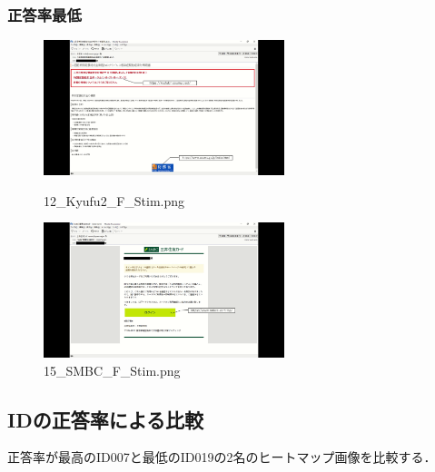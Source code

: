 \documentclass[a4paper,11pt]{ltjsreport}
\begin{document}
\subsubsection{正答率最低}
\begin{figure}[H]
	\centering
	\begin{minipage}{0.49\textwidth}
		\centering
		\includegraphics[width=7cm]{img/stimuli/12_Kyufu2_F_Stim.png}
		\caption{12\_Kyufu2\_F\_Stim.png}
		\label{fig:a121}
	\end{minipage}
	\begin{minipage}{0.49\textwidth}
		\centering
		\includegraphics[width=7cm]{img/stimuli/15_SMBC_F_Stim.png}
		\caption{15\_SMBC\_F\_Stim.png}
		\label{fig:a151}
	\end{minipage}
\end{figure}

\subsection{IDの正答率による比較}
\label{sec:idacccompare}
正答率が最高のID007と最低のID019の2名のヒートマップ画像を比較する．
\end{document}

